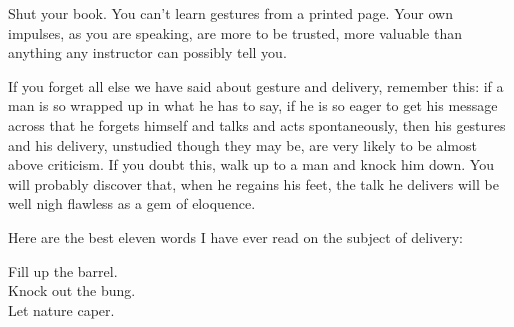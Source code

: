 \documentclass[10pt]{article}
\begin{document}
Shut your book. You can't learn gestures from a printed page. Your own impulses, as you are speaking, are more to be trusted, more valuable than anything any instructor can possibly tell you.

If you forget all else we have said about gesture and delivery, remember this: if a man is so wrapped up in what he has to say, if he is so eager to get his message across that he forgets himself and talks and acts spontaneously, then his gestures and his delivery, unstudied though they may be, are very likely to be almost above criticism. If you doubt this, walk up to a man and knock him down. You will probably discover that, when he regains his feet, the talk he delivers will be well nigh flawless as a gem of eloquence.

Here are the best eleven words I have ever read on the subject of delivery:

\begin{displayquote}
Fill up the barrel.\\
Knock out the bung.\\
Let nature caper.
\end{displayquote}
\end{document}
